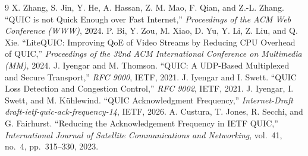 \documentclass[11pt]{article}
\begin{document}
\begin{thebibliography}{9}
\setlength{\itemsep}{1pt}\setlength{\parsep}{0pt}
 X. Zhang, S. Jin, Y. He, A. Hassan, Z. M. Mao, F. Qian, and Z.-L. Zhang.
  ``QUIC is not Quick Enough over Fast Internet,'' \emph{Proceedings of the ACM Web Conference
  (WWW)}, 2024.
 P. Bi, Y. Zou, M. Xiao, D. Yu, Y. Li, Z. Liu, and Q. Xie. ``LiteQUIC:
  Improving QoE of Video Streams by Reducing CPU Overhead of QUIC,'' \emph{Proceedings of the 32nd
  ACM International Conference on Multimedia (MM)}, 2024.
 J. Iyengar and M. Thomson. ``QUIC: A UDP-Based Multiplexed and Secure
  Transport,'' \emph{RFC 9000}, IETF, 2021.
 J. Iyengar and I. Swett. ``QUIC Loss Detection and Congestion Control,''
  \emph{RFC 9002}, IETF, 2021.
 J. Iyengar, I. Swett, and M. K\"uhlewind. ``QUIC Acknowledgment Frequency,''
  \emph{Internet-Draft draft-ietf-quic-ack-frequency-14}, IETF, 2026.
 A. Custura, T. Jones, R. Secchi, and G. Fairhurst. ``Reducing the
  Acknowledgement Frequency in IETF QUIC,'' \emph{International Journal of Satellite Communications
  and Networking}, vol.~41, no.~4, pp.~315--330, 2023.
\end{thebibliography}
\end{document}
